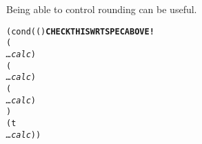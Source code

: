 \documentclass[../Example-Program.tex]{subfiles}
\begin{document}
Being able to control rounding can be useful.
\begin{alltt}
    (cond (() \textbf{CHECK THIS WRT SPEC ABOVE!}
           ( 
              \textit{\ldots calc})
           (
              \textit{\ldots calc})
           (
              \textit{\ldots calc})
           )
          (t
           \textit{\ldots calc}))
\end{alltt}
\end{document}
